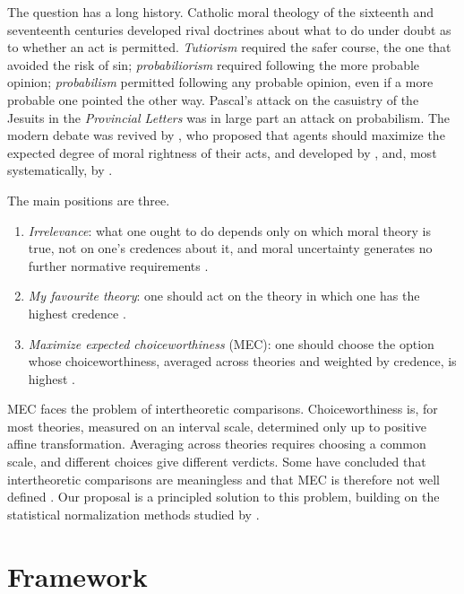 \documentclass{situationist-preprint}
\begin{document}
The question has a long history. Catholic moral theology of the sixteenth and seventeenth centuries developed rival doctrines about what to do under doubt as to whether an act is permitted. \emph{Tutiorism} required the safer course, the one that avoided the risk of sin; \emph{probabiliorism} required following the more probable opinion; \emph{probabilism} permitted following any probable opinion, even if a more probable one pointed the other way. Pascal's attack on the casuistry of the Jesuits in the \emph{Provincial Letters} was in large part an attack on probabilism. The modern debate was revived by \citet{Lockhart2000}, who proposed that agents should maximize the expected degree of moral rightness of their acts, and developed by \citet{Sepielli2009}, \citet{Ross2006} and, most systematically, by \citet{MacAskillBykvistOrd2020}.

The main positions are three.
\begin{enumerate}[label=(\roman*)]
\item \emph{Irrelevance}: what one ought to do depends only on which moral theory is true, not on one's credences about it, and moral uncertainty generates no further normative requirements \citep{Weatherson2014,Harman2015}.
\item \emph{My favourite theory}: one should act on the theory in which one has the highest credence \citep{GustafssonTorpman2014}.
\item \emph{Maximize expected choiceworthiness} (MEC): one should choose the option whose choiceworthiness, averaged across theories and weighted by credence, is highest \citep{Lockhart2000,MacAskillBykvistOrd2020}.
\end{enumerate}

MEC faces the problem of intertheoretic comparisons. Choiceworthiness is, for most theories, measured on an interval scale, determined only up to positive affine transformation. Averaging across theories requires choosing a common scale, and different choices give different verdicts. Some have concluded that intertheoretic comparisons are meaningless and that MEC is therefore not well defined \citep{Hedden2016}. Our proposal is a principled solution to this problem, building on the statistical normalization methods studied by \citet{CottonBarrattMacAskillOrd2020}.

\section{Framework}
\end{document}
